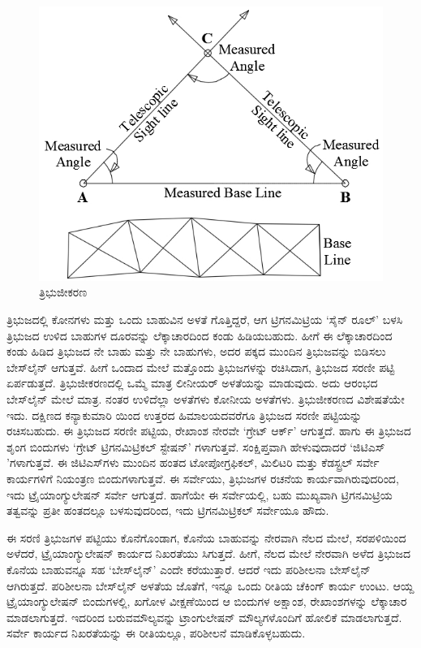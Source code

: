 \begin{figure}[!htbp]
\includegraphics[scale=.7]{"images/image003.jpg"}
\caption{ತ್ರಿಭುಜೀಕರಣ}\label{chap3-fig01}
\end{figure}

ತ್ರಿಭುಜದಲ್ಲಿ  ಕೋನಗಳು ಮತ್ತು ಒಂದು ಬಾಹುವಿನ ಅಳತೆ ಗೊತ್ತಿದ್ದರೆ, ಆಗ ಟ್ರಿಗನಮಿಟ್ರಿಯ ‘ಸೈನ್​ ರೂಲ್​’ ಬಳಸಿ ತ್ರಿಭುಜದ ಉಳಿದ  ಬಾಹುಗಳ ದೂರವನ್ನು ಲೆಕ್ಕಾಚಾರದಿಂದ ಕಂಡು ಹಿಡಿಯಬಹುದು. ಹೀಗೆ ಈ ಲೆಕ್ಕಾಚಾರದಿಂದ ಕಂಡು ಹಿಡಿದ ತ್ರಿಭುಜದ ನೇ ಬಾಹು ಮತ್ತು ನೇ ಬಾಹುಗಳು, ಅದರ ಪಕ್ಕದ ಮುಂದಿನ ತ್ರಿಭುಜವನ್ನು ಬಿಡಿಸಲು ಬೇಸ್‌ಲೈನ್​ ಆಗುತ್ತವೆ. ಹೀಗೆ ಒಂದಾದ ಮೇಲೆ ಮತ್ತೊಂದು ತ್ರಿಭುಜಗಳನ್ನು ರಚಿಸಿದಾಗ, ತ್ರಿಭುಜದ ಸರಣೀ ಪಟ್ಟಿ ಏರ್ಪಡುತ್ತದೆ. ತ್ರಿಭುಜೀಕರಣದಲ್ಲಿ ಒಮ್ಮೆ ಮಾತ್ರ ಲೀನೀಯರ್​ ಅಳತೆಯನ್ನು ಮಾಡುವುದು. ಅದು ಆರಂಭದ ಬೇಸ್‌ಲೈನ್​ ಮೇಲೆ ಮಾತ್ರ. ನಂತರ ಉಳಿದೆಲ್ಲಾ ಅಳತೆಗಳು ಕೋನೀಯ ಅಳತೆಗಳು. ತ್ರಿಭುಜೀಕರಣದ ವಿಶೇಷತೆಯೇ ಇದು. ದಕ್ಷಿಣದ ಕನ್ಯಾಕುಮಾರಿ ಯಿಂದ ಉತ್ತರದ ಹಿಮಾಲಯದವರೆಗೂ ತ್ರಿಭುಜದ ಸರಣೀ ಪಟ್ಟಿಯನ್ನು ರಚಿಸಬಹುದು. ಈ ತ್ರಿಭುಜದ ಸರಣೀ ಪಟ್ಟಿಯ, ರೇಖಾಂಶ ನೇರವೇ ‘ಗ್ರೇಟ್​ ಆರ್ಕ್’ ಆಗುತ್ತದೆ. ಹಾಗು ಈ ತ್ರಿಭುಜದ ಶೃಂಗ ಬಿಂದುಗಳು ‘ಗ್ರೇಟ್​ ಟ್ರಿಗನಮಿಟ್ರಿಕಲ್​ ಸ್ಟೇಷನ್​’ ಗಳಾಗುತ್ತವೆ. ಸಂಕ್ಷಿಪ್ತವಾಗಿ ಹೇಳುವುದಾದರೆ ‘ಜಿಟಿಎಸ್​’ಗಳಾಗುತ್ತವೆ. ಈ ಜಿಟಿಎಸ್​ಗಳು ಮುಂದಿನ ಹಂತದ ಟೋಪೋಗ್ರಫಿಕಲ್​, ಮಿಲಿಟರಿ ಮತ್ತು ಕೆಡಸ್ಟ್ರಲ್​ ಸರ್ವೇ ಕಾರ್ಯಗಳಿಗೆ ನಿಯಂತ್ರಣ ಬಿಂದುಗಳಾಗುತ್ತವೆ. ಈ ಸರ್ವೇಯು, ತ್ರಿಭುಜಗಳ ರಚನೆಯ ಕಾರ್ಯವಾಗಿರುವುದರಿಂದ, ಇದು ಟ್ರೈಯಾಂಗ್ಯುಲೇಷನ್​ ಸರ್ವೇ ಆಗುತ್ತದೆ. ಹಾಗೆಯೇ ಈ ಸರ್ವೇಯಲ್ಲಿ, ಬಹು ಮುಖ್ಯವಾಗಿ ಟ್ರಿಗನಮಿಟ್ರಿಯ ತತ್ವವನ್ನು ಪ್ರತೀ ಹಂತದಲ್ಲೂ ಬಳಸುವುದರಿಂದ, ಇದು ಟ್ರಿಗನಮಿಟ್ರಿಕಲ್​ ಸರ್ವೇಯೂ ಹೌದು.

ಈ ಸರಣಿ ತ್ರಿಭುಜಗಳ ಪಟ್ಟಿಯು ಕೊನೆಗೊಂಡಾಗ, ಕೊನೆಯ ಬಾಹುವನ್ನು ನೇರವಾಗಿ ನೆಲದ ಮೇಲೆ, ಸರಪಳಿಯಿಂದ ಅಳೆದರೆ, ಟ್ರೈಯಾಂಗ್ಯುಲೇಷನ್​ ಕಾರ್ಯದ ನಿಖರತೆಯು ಸಿಗುತ್ತದೆ. ಹೀಗೆ, ನೆಲದ ಮೇಲೆ ನೇರವಾಗಿ ಅಳೆದ ತ್ರಿಭುಜದ ಕೊನೆಯ ಬಾಹುವನ್ನೂ ಸಹ ‘ಬೇಸ್‌ಲೈನ್​’ ಎಂದೇ ಕರೆಯುತ್ತಾರೆ. ಆದರೆ ಇದು ಪರಿಶೀಲನಾ ಬೇಸ್‌ಲೈನ್​ ಆಗಿರುತ್ತದೆ. ಪರಿಶೀಲನಾ ಬೇಸ್‌ಲೈನ್​ ಅಳತೆಯ ಜೊತೆಗೆ, ಇನ್ನೂ ಒಂದು ರೀತಿಯ ಚೆಕಿಂಗ್​ ಕಾರ್ಯ ಉಂಟು. ಆಯ್ದ ಟ್ರೈಯಾಂಗ್ಯುಲೇಷನ್​ ಬಿಂದುಗಳಲ್ಲಿ, ಖಗೋಳ ವೀಕ್ಷಣೆಯಿಂದ ಆ ಬಿಂದುಗಳ ಅಕ್ಷಾಂಶ, ರೇಖಾಂಶಗಳನ್ನು ಲೆಕ್ಕಾಚಾರ ಮಾಡಲಾಗುತ್ತದೆ. ಇದರಿಂದ ಬರುವ\break ಮೌಲ್ಯವನ್ನು ಟ್ರಾಂಗುಲೇಷನ್​ ಮೌಲ್ಯಗಳೊಂದಿಗೆ ಹೋಲಿಕೆ ಮಾಡಲಾಗುತ್ತದೆ. ಸರ್ವೇ ಕಾರ್ಯದ ನಿಖರತೆಯನ್ನು ಈ ರೀತಿಯಲ್ಲೂ, ಪರಿಶೀಲನೆ ಮಾಡಿಕೊಳ್ಳಬಹುದು.

